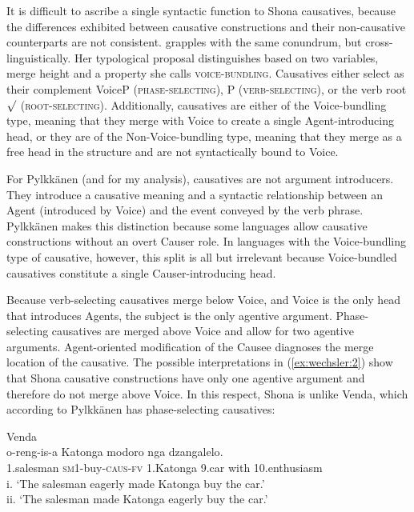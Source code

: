 \documentclass[output=paper,modfonts,nonflat,colorlinks,citecolor=brown]{langsci/langscibook}
\begin{document}
It is difficult to ascribe a single syntactic function to Shona causatives, because the differences exhibited between causative constructions and their non-causative counterparts are not consistent. \citet{Pylkkänen2008} grapples with the same conundrum, but cross-linguistically. Her typological proposal distinguishes based on two variables, merge height and a property she calls \textsc{voice-bundling.} Causatives either select as their complement VoiceP  (\textsc{phase-selecting)}, \liv P \textsc{(verb-selecting)}, or the verb root ${\surd}$ (\textsc{root-selecting)}. Additionally, causatives are either of the Voice-bundling type, meaning that they merge with Voice to create a single Agent-introducing head, or they are of the Non-Voice-bundling type, meaning that they merge as a free head in the structure and are not syntactically bound to Voice.

For Pylkkänen (and for my analysis), causatives are not argument introducers. They introduce a causative meaning and a syntactic relationship between an Agent (introduced by Voice) and the event conveyed by the verb phrase. Pylkkänen makes this distinction because some languages allow causative constructions without an overt Causer role. In languages with the Voice-bundling type of causative, however, this split is all but irrelevant because Voice-bundled causatives constitute a single Causer-introducing head.

Because verb-selecting causatives merge below Voice, and Voice is the only head that introduces Agents, the subject is the only agentive argument. Phase-selecting causatives are merged above Voice and allow for two agentive arguments. Agent-oriented modification of the Causee diagnoses the merge location of the causative. The possible interpretations in (\ref{ex:wechsler:2}) show that Shona causative constructions have only one agentive argument and therefore do not merge above Voice. In this respect, Shona is unlike Venda, which according to Pylkkänen has phase-selecting causatives:

\ea\label{ex:wechsler:3}
Venda \citep[83]{Pylkkänen2008}\\
 {o-reng-is-a} {Katonga} {modoro} {nga} {dzangalelo}.\\
1.salesman \textsc{sm1-}buy\textsc{-caus-fv} 1.Katonga 9.car with 10.enthusiasm\\
\glt i. ‘The salesman eagerly made Katonga buy the car.’\\
ii. ‘The salesman made Katonga eagerly buy the car.’
\z
\end{document}
